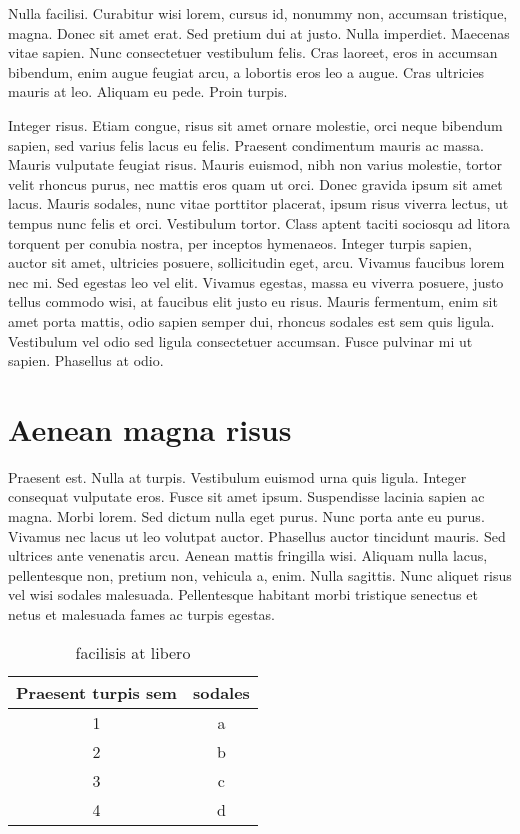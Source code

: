 Nulla facilisi. Curabitur wisi lorem, cursus id, nonummy non,
accumsan tristique, magna. Donec sit amet erat. Sed pretium dui at
justo. Nulla imperdiet. Maecenas vitae sapien. Nunc consectetuer
vestibulum felis. Cras laoreet, eros in accumsan bibendum, enim
augue feugiat arcu, a lobortis eros leo a augue. Cras ultricies
mauris at leo. Aliquam eu pede. Proin turpis.

Integer risus. Etiam congue, risus sit amet ornare molestie, orci
neque bibendum sapien, sed varius felis lacus eu felis. Praesent
condimentum mauris ac massa. Mauris vulputate feugiat risus.
Mauris euismod, nibh non varius molestie, tortor velit rhoncus
purus, nec mattis eros quam ut orci. Donec gravida ipsum sit amet
lacus. Mauris sodales, nunc vitae porttitor placerat, ipsum risus
viverra lectus, ut tempus nunc felis et orci. Vestibulum tortor.
Class aptent taciti sociosqu ad litora torquent per conubia
nostra, per inceptos hymenaeos. Integer turpis sapien, auctor sit
amet, ultricies posuere, sollicitudin eget, arcu. Vivamus faucibus
lorem nec mi. Sed egestas leo vel elit. Vivamus egestas, massa eu
viverra posuere, justo tellus commodo wisi, at faucibus elit justo
eu risus. Mauris fermentum, enim sit amet porta mattis, odio
sapien semper dui, rhoncus sodales est sem quis ligula. Vestibulum
vel odio sed ligula consectetuer accumsan. Fusce pulvinar mi ut
sapien. Phasellus at odio.

\section{Aenean magna risus}

Praesent est. Nulla at turpis. Vestibulum euismod urna quis
ligula. Integer consequat vulputate eros. Fusce sit amet ipsum.
Suspendisse lacinia sapien ac magna. Morbi lorem. Sed dictum nulla
eget purus. Nunc porta ante eu purus. Vivamus nec lacus ut leo
volutpat auctor. Phasellus auctor tincidunt mauris. Sed ultrices
ante venenatis arcu. Aenean mattis fringilla wisi. Aliquam nulla
lacus, pellentesque non, pretium non, vehicula a, enim. Nulla
sagittis. Nunc aliquet risus vel wisi sodales malesuada.
Pellentesque habitant morbi tristique senectus et netus et
malesuada fames ac turpis egestas.

\begin{table}[!ht]
\centering
\begin{tabular}{|c|c|}
  \hline
 Praesent turpis sem& sodales\\
  \hline
  1 & a \\
  2 & b \\
  3 & c \\
  4 & d \\
  \hline
\end{tabular}
\caption{facilisis at libero}
\end{table}


